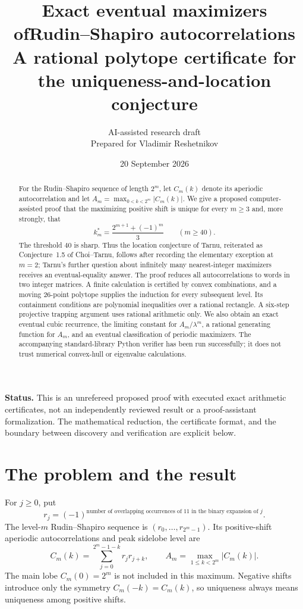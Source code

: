 \documentclass[11pt,a4paper]{article}
\title{\textbf{Exact eventual maximizers of\newline Rudin--Shapiro autocorrelations}\\[0.55em]
\large A rational polytope certificate for the uniqueness-and-location conjecture}
\author{AI-assisted research draft\\\small Prepared for Vladimir Reshetnikov}
\date{20 September 2026}
\theoremstyle{definition}\newtheorem{definition}[theorem]{Definition}
\theoremstyle{remark}\newtheorem{remark}[theorem]{Remark}
\begin{document}
\maketitle
\begin{abstract}
For the Rudin--Shapiro sequence of length $2^m$, let $C_m(k)$ denote its
aperiodic autocorrelation and let $A_m=\max_{0<k<2^m}|C_m(k)|$.
We give a proposed computer-assisted proof that the maximizing positive shift
is unique for every $m\ge3$ and, more strongly, that
\[
 k_m^*=\frac{2^{m+1}+(-1)^m}{3}\qquad(m\ge40).
\]
The threshold $40$ is sharp. Thus the location conjecture of Tarnu, reiterated
as Conjecture~1.5 of Choi--Tarnu, follows after recording the elementary
exception at $m=2$; Tarnu's further question about infinitely many
nearest-integer maximizers receives an eventual-equality answer.
The proof reduces all autocorrelations to words in two integer matrices.
A finite calculation is certified by convex combinations, and a moving
26-point polytope supplies the induction for every subsequent level.
Its containment conditions are polynomial inequalities over a rational
rectangle. A six-step projective trapping argument uses rational arithmetic
only. We also obtain an exact eventual cubic recurrence, the limiting
constant for $A_m/\lambda^m$, a rational generating function for $A_m$, and
an eventual classification of periodic maximizers.
The accompanying standard-library Python verifier has been run successfully;
it does not trust numerical convex-hull or eigenvalue calculations.
\end{abstract}

\begin{center}
\begin{minipage}{0.92\textwidth}\small
\textbf{Status.} This is an unrefereed proposed proof with executed exact
arithmetic certificates, not an independently reviewed result or a
proof-assistant formalization. The mathematical reduction, the certificate
format, and the boundary between discovery and verification are explicit below.
\end{minipage}
\end{center}
\clearpage
\tableofcontents
\clearpage

\section{The problem and the result}
\label{sec:result}

For $j\ge0$, put
\[
 r_j=(-1)^{\text{number of overlapping occurrences of $11$ in the binary expansion of $j$}}.
\]
The level-$m$ Rudin--Shapiro sequence is $(r_0,\ldots,r_{2^m-1})$.
Its positive-shift aperiodic autocorrelations and peak sidelobe level are
\begin{equation}
 C_m(k)=\sum_{j=0}^{2^m-1-k}r_jr_{j+k},\qquad
 A_m=\max_{1\le k<2^m}|C_m(k)|.
 \label{eq:definition}
\end{equation}
The main lobe $C_m(0)=2^m$ is not included in this maximum.
Negative shifts introduce only the symmetry $C_m(-k)=C_m(k)$, so uniqueness
always means uniqueness among positive shifts.
\end{document}

